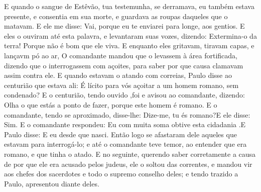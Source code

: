 {E quando o sangue de Estêvão, tua testemunha, se derramava, eu também estava presente, e consentia em sua morte, e guardava as roupas daqueles que o matavam.
E ele me disse: Vai, porque eu te enviarei para longe, aos gentios.
E eles o ouviram até esta palavra, e
{} levantaram suas vozes, dizendo: Extermina-o da terra! Porque não é bom que ele viva.
E enquanto eles gritavam, tiravam
{} capas, e lançavm pó ao ar,
O comandante mandou que o levassem à área fortificada, dizendo que o interrogassem com açoites, para saber por que causa clamavam assim contra ele.
E quando estavam o atando com correias, Paulo disse ao centurião que estava ali: É lícito para vós açoitar a um homem romano, sem
{} condenado?
E o centurião, tendo ouvido
{} ,foi e avisou ao comandante, dizendo: Olha o que estás a ponto de fazer, porque este homem é romano.
E o comandante, tendo se aproximado, disse-lhe: Dize-me, tu és romano?E ele disse: Sim.
E o comandante respondeu: Eu com muita soma
{} obtive esta cidadania
{} .E Paulo disse: E eu
{} desde que nasci.
Então logo se afastaram dele aqueles que estavam para interrogá-lo; e até o comandante teve temor, ao entender que
{} era romano, e que tinha o atado.
E no{} seguinte, querendo saber corretamente a causa de por que ele era acusado pelos judeus, ele o soltou das correntes, e mandou vir aos chefes dos sacerdotes e todo o supremo conselho
 deles; e tendo trazido a Paulo, apresentou
{} diante deles.

}
